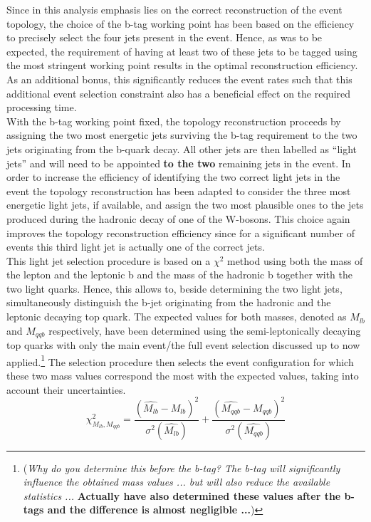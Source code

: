 Since in this analysis emphasis lies on the correct reconstruction of the event topology, the choice of the b-tag working point has been based on the efficiency to precisely select the four jets present in the event. Hence, as was to be expected, the requirement of having at least two of these jets to be tagged using the most stringent working point results in the optimal reconstruction efficiency. As an additional bonus, this significantly reduces the event rates such that this additional event selection constraint also has a beneficial effect on the required processing time.
\\
With the b-tag working point fixed, the topology reconstruction proceeds by assigning the two most energetic jets surviving the b-tag requirement to the two jets originating from the b-quark decay. All other jets are then labelled as ``light jets'' and will need to be appointed \textbf{to the two} remaining jets in the event. 
In order to increase the efficiency of identifying the two correct light jets in the event the topology reconstruction has been adapted to consider the three most energetic light jets, if available, and assign the two most plausible ones to the jets produced during the hadronic decay of one of the W-bosons.
This choice again improves the topology reconstruction efficiency since for a significant number of events this third light jet is actually one of the correct jets.
\\
This light jet selection procedure is based on a $\chi^{2}$ method using both the mass of the lepton and the leptonic b and the mass of the hadronic b together with the two light quarks. Hence, this allows to, beside determining the two light jets, simultaneously distinguish the b-jet originating from the hadronic and the leptonic decaying top quark.
The expected values for both masses, denoted as $M_{lb}$ and $M_{qqb}$ respectively, have been determined using the semi-leptonically decaying top quarks with only the main event/the full event selection discussed up to now applied.\footnote{ (\textit{Why do you determine this before the b-tag? The b-tag will significantly influence the obtained mass values ... but will also reduce the available statistics ...} \textbf{Actually have also determined these values after the b-tags and the difference is almost negligible ...})}
The selection procedure then selects the event configuration for which these two mass values correspond the most with the expected values, taking into account their uncertainties.
\begin{equation}
 \chi^{2}_{M_{lb}, M_{qqb}} = \frac{(\hat{M_{lb}} - M_{lb})^{2}}{\sigma^{2}(\hat{M_{lb}})} + \frac{(\hat{M_{qqb}} - M_{qqb})^{2}}{\sigma^{2}(\hat{M_{qqb}})}
\end{equation}

